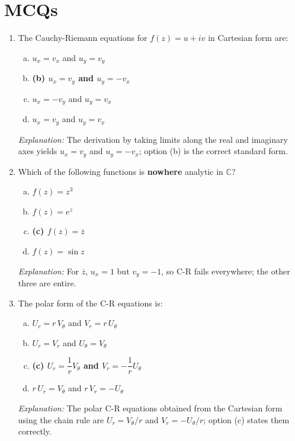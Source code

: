 \documentclass[12pt,a4paper]{article}
\begin{document}
\section{MCQs}

\begin{enumerate}
  \item The Cauchy-Riemann equations for $f(z) = u + iv$ in Cartesian form are:
  \begin{enumerate}[(a)]
    \item $u_x = v_x$ and $u_y = v_y$
    \item \textbf{(b) $u_x = v_y$ and $u_y = -v_x$}
    \item $u_x = -v_y$ and $u_y = v_x$
    \item $u_x = v_y$ and $u_y = v_x$
  \end{enumerate}
  \textit{Explanation:} The derivation by taking limits along the real and imaginary axes yields $u_x = v_y$ and $u_y = -v_x$; option (b) is the correct standard form.

  \medskip

  \item Which of the following functions is \textbf{nowhere} analytic in $\mathbb{C}$?
  \begin{enumerate}[(a)]
    \item $f(z) = z^3$
    \item $f(z) = e^z$
    \item \textbf{(c) $f(z) = \overline{z}$}
    \item $f(z) = \sin z$
  \end{enumerate}
  \textit{Explanation:} For $\overline{z}$, $u_x = 1$ but $v_y = -1$, so C-R fails everywhere; the other three are entire.

  \medskip

  \item The polar form of the C-R equations is:
  \begin{enumerate}[(a)]
    \item $U_r = r\,V_\theta$ and $V_r = r\,U_\theta$
    \item $U_r = V_r$ and $U_\theta = V_\theta$
    \item \textbf{(c) $U_r = \dfrac{1}{r}V_\theta$ and $V_r = -\dfrac{1}{r}U_\theta$}
    \item $r\,U_r = V_\theta$ and $r\,V_r = -U_\theta$
  \end{enumerate}
  \textit{Explanation:} The polar C-R equations obtained from the Cartesian form using the chain rule are $U_r = V_\theta/r$ and $V_r = -U_\theta/r$; option (c) states them correctly.


\end{enumerate}
\end{document}
